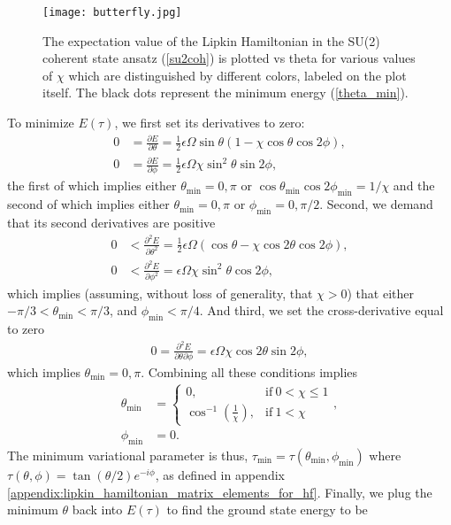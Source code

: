 \documentclass[Dual]{msu-thesis}
\begin{document}
\begin{figure}
    \centering
    \texttt{[image: butterfly.jpg]}
    \caption{The expectation value of the Lipkin Hamiltonian in the SU(2) coherent state ansatz (\ref{su2coh}) is plotted vs theta for various values of $\chi$ which are distinguished by different colors, labeled on the plot itself. The black dots represent the minimum energy (\ref{theta_min}).}
    \label{fig:butterfly}
\end{figure}
To minimize $E(\tau)$, we first set its derivatives to zero:
\begin{align}
0
&=
\frac{\partial E}{\partial\theta}
=
\frac{1}{2}\epsilon\Omega\sin\theta(1-\chi\cos\theta\cos2\phi),
\\
0
&=
\frac{\partial E}{\partial\phi}
=
\frac{1}{2}\epsilon\Omega\chi\sin^2\theta\sin2\phi,
\end{align}
the first of which implies either $\theta_{\text{min}}=0,\pi$ or $\cos\theta_{\text{min}}\cos2\phi_{\text{min}}=1/\chi$ and the second of which implies either $\theta_{\text{min}}=0,\pi$ or $\phi_{\text{min}}=0,\pi/2$. Second, we demand that its second derivatives are positive
\begin{align}
0
&<
\frac{\partial^2E}{\partial\theta^2}
=\frac{1}{2}\epsilon\Omega(\cos\theta-\chi\cos2\theta\cos2\phi),
\\
0
&<
\frac{\partial^2E}{\partial\phi^2}
=
\epsilon\Omega\chi\sin^2\theta\cos2\phi
,\end{align}
which implies (assuming, without loss of generality, that $\chi>0$) that either $-\pi/3<\theta_{\text{min}}<\pi/3$, and $\phi_{\text{min}}<\pi/4$.
And third, we set the cross-derivative equal to zero
\begin{align}
0
=
\frac{\partial^2E}{\partial\theta\partial\phi}
=
\epsilon\Omega\chi\cos2\theta\sin2\phi
,\end{align}
which implies $\theta_{\text{min}}=0,\pi$. Combining all these conditions implies 
\begin{align}
\label{theta_min}
\theta_{\text{min}}
&=
\begin{cases}
0, & \text{if} \ 0<\chi\leq1
\\
\cos^{-1}\left(\frac{1}{\chi}\right), & \text{if} \ 1<\chi
\end{cases},
\\
\phi_{\text{min}}
&=0.
\end{align}
The minimum variational parameter is thus, $\tau_{\text{min}}=\tau(\theta_{\text{min}},\phi_{\text{min}})$ where $\tau(\theta,\phi)=\tan(\theta/2)e^{-i\phi}$, as defined in appendix \ref{appendix:lipkin_hamiltonian_matrix_elements_for_hf}. Finally, we plug the minimum $\theta$ back into $E(\tau)$ to find the ground state energy to be
\end{document}
